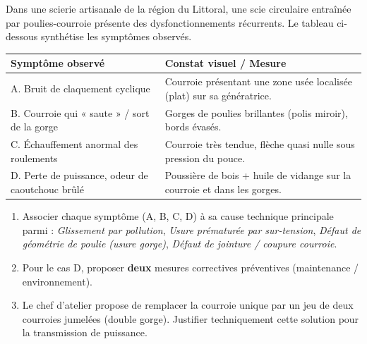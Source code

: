 \documentclass[11pt]{article}
\begin{document}
\begin{exercice}
Dans une scierie artisanale de la région du Littoral, une scie circulaire entraînée par poulies-courroie présente des dysfonctionnements récurrents. Le tableau ci-dessous synthétise les symptômes observés.

\begin{tabular}{|p{3.5cm}|p{5.5cm}|}
\hline
\textbf{Symptôme observé} & \textbf{Constat visuel / Mesure} \\
\hline
A. Bruit de claquement cyclique & Courroie présentant une zone usée localisée (plat) sur sa génératrice. \\
\hline
B. Courroie qui « saute » / sort de la gorge & Gorges de poulies brillantes (polis miroir), bords évasés. \\
\hline
C. Échauffement anormal des roulements & Courroie très tendue, flèche quasi nulle sous pression du pouce. \\
\hline
D. Perte de puissance, odeur de caoutchouc brûlé & Poussière de bois + huile de vidange sur la courroie et dans les gorges. \\
\hline
\end{tabular}

\begin{enumerate}
    \item Associer chaque symptôme (A, B, C, D) à sa cause technique principale parmi : \textit{Glissement par pollution}, \textit{Usure prématurée par sur-tension}, \textit{Défaut de géométrie de poulie (usure gorge)}, \textit{Défaut de jointure / coupure courroie}.
    \item Pour le cas D, proposer \textbf{deux} mesures correctives préventives (maintenance / environnement).
    \item Le chef d'atelier propose de remplacer la courroie unique par un jeu de deux courroies jumelées (double gorge). Justifier techniquement cette solution pour la transmission de puissance.
\end{enumerate}
\end{exercice}
\end{document}
